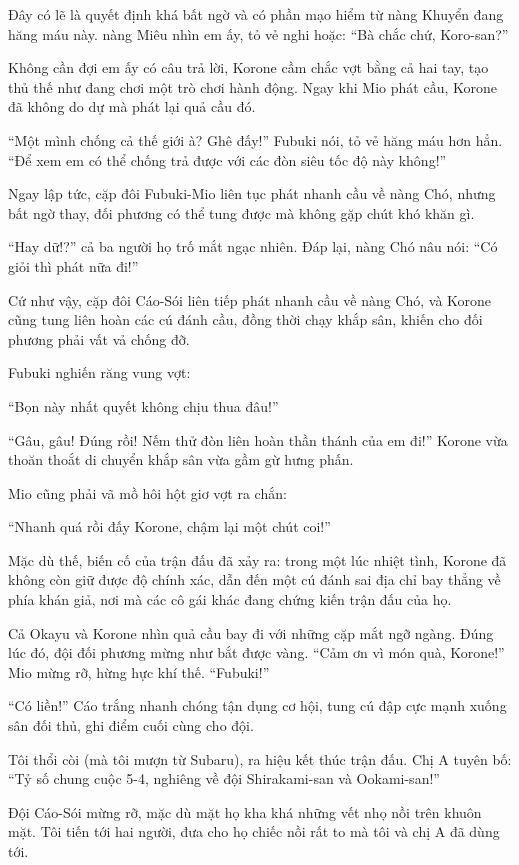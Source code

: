 \documentclass[../main.tex]{subfiles}
\begin{document}
Đây có lẽ là quyết định khá bất ngờ và có phần mạo hiểm từ nàng Khuyển đang hăng máu này. nàng Miêu nhìn em ấy, tỏ vẻ nghi hoặc: ``Bà chắc chứ, Koro-san?''

Không cần đợi em ấy có câu trả lời, Korone cầm chắc vợt bằng cả hai tay, tạo thủ thế như đang chơi một trò chơi hành động. Ngay khi Mio phát cầu, Korone đã không do dự mà phát lại quả cầu đó.

``Một mình chống cả thế giới à? Ghê đấy!'' Fubuki nói, tỏ vẻ hăng máu hơn hẳn. ``Để xem em có thể chống trả được với các đòn siêu tốc độ này không!''

Ngay lập tức, cặp đôi Fubuki-Mio liên tục phát nhanh cầu về nàng Chó, nhưng bất ngờ thay, đối phương có thể tung được mà không gặp chút khó khăn gì.

``Hay dữ!?'' cả ba người họ trố mắt ngạc nhiên. Đáp lại, nàng Chó nâu nói: ``Có giỏi thì phát nữa đi!''

Cứ như vậy, cặp đôi Cáo-Sói liên tiếp phát nhanh cầu về nàng Chó, và Korone cũng tung liên hoàn các cú đánh cầu, đồng thời chạy khắp sân, khiến cho đối phương phải vất vả chống đỡ.

Fubuki nghiến răng vung vợt:

``Bọn này nhất quyết không chịu thua đâu!''

``Gâu, gâu! Đúng rồi! Nếm thử đòn liên hoàn thần thánh của em đi!'' Korone vừa thoăn thoắt di chuyển khắp sân vừa gầm gừ hưng phấn.

Mio cũng phải vã mồ hôi hột giơ vợt ra chắn:

``Nhanh quá rồi đấy Korone, chậm lại một chút coi!''

Mặc dù thế, biến cố của trận đấu đã xảy ra: trong một lúc nhiệt tình, Korone đã không còn giữ được độ chính xác, dẫn đến một cú đánh sai địa chỉ bay thẳng về phía khán giả, nơi mà các cô gái khác đang chứng kiến trận đấu của họ.

Cả Okayu và Korone nhìn quả cầu bay đi với những cặp mắt ngỡ ngàng. Đúng lúc đó, đội đối phương mừng như bắt được vàng. ``Cảm ơn vì món quà, Korone!'' Mio mừng rỡ, hừng hực khí thế. ``Fubuki!''

``Có liền!'' Cáo trắng nhanh chóng tận dụng cơ hội, tung cú đập cực mạnh xuống sân đối thủ, ghi điểm cuối cùng cho đội.

Tôi thổi còi (mà tôi mượn từ Subaru), ra hiệu kết thúc trận đấu. Chị A tuyên bố: ``Tỷ số chung cuộc 5-4, nghiêng về đội Shirakami-san và Ookami-san!''

Đội Cáo-Sói mừng rỡ, mặc dù mặt họ kha khá những vết nhọ nồi trên khuôn mặt. Tôi tiến tới hai người, đưa cho họ chiếc nồi rất to mà tôi và chị A đã dùng tới.
\end{document}

